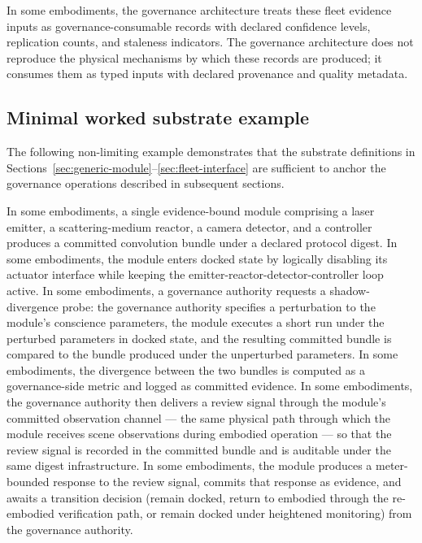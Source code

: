 \documentclass[a4paper,12pt]{article}
\newcommand{\cb}{convolution bundle\xspace}
\begin{document}
In some embodiments, the governance architecture treats these fleet
evidence inputs as governance-consumable records with declared
confidence levels, replication counts, and staleness indicators. The
governance architecture does not reproduce the physical mechanisms by
which these records are produced; it consumes them as typed inputs with
declared provenance and quality metadata.

\subsection{Minimal worked substrate example}


The following non-limiting example demonstrates that the substrate
definitions in Sections~\ref{sec:generic-module}--\ref{sec:fleet-interface}
are sufficient to anchor the governance operations described in
subsequent sections.

In some embodiments, a single evidence-bound module comprising a
laser emitter, a scattering-medium reactor, a camera detector, and a
controller produces a committed \cb under a declared
protocol digest. In some embodiments, the module enters docked state
by logically disabling its actuator interface while keeping the
emitter-reactor-detector-controller loop active. In some embodiments,
a governance authority requests a shadow-divergence probe: the
governance authority specifies a perturbation to the module's
conscience parameters, the module executes a short run under the
perturbed parameters in docked state, and the resulting committed
bundle is compared to the bundle produced under the unperturbed
parameters. In some embodiments, the divergence between the two
bundles is computed as a governance-side metric and logged as committed
evidence. In some embodiments, the governance authority then delivers
a review signal through the module's committed observation channel ---
the same physical path through which the module receives scene
observations during embodied operation --- so that the review signal
is recorded in the committed bundle and is auditable under the same
digest infrastructure. In some embodiments, the module produces a
meter-bounded response to the review signal, commits that response as
evidence, and awaits a transition decision (remain docked, return to
embodied through the re-embodied verification path, or remain docked
under heightened monitoring) from the governance authority.
\end{document}
